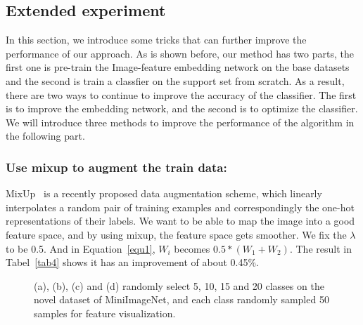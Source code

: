 \documentclass[runningheads]{llncs}
\begin{document}
\subsection{Extended experiment}
In this section, we introduce some tricks that can further improve the performance of our approach. As is shown before, our method has two parts, the first one is pre-train the Image-feature embedding network on the base datasets and the second is train a classfier on the support set from scratch. As a result, there are two ways to continue to improve the accuracy of the classifier. The first is to improve the embedding network, and the second is to optimize the classifier. We will introduce three methods to improve the performance of the algorithm in the following part.
\subsubsection{Use mixup to augment the train data:}
MixUp~\cite{zhang2017mixup} is a recently proposed data augmentation scheme, which linearly interpolates a random pair of training examples and correspondingly the one-hot representations of their labels. We want to be able to map the image into a good feature space, and by using mixup, the feature space gets smoother. We fix the $\lambda$to be 0.5. And in Equation~\ref{equ1}, $W_{i}$ becomes $0.5*(W_{1}+W_{2})$. The result in Tabel~\ref{tab4} shows it has an improvement of about 0.45\%.

\begin{figure}[htbp]
 \centering
\caption{(a), (b), (c) and (d) randomly select 5, 10, 15 and 20 classes on the novel dataset of MiniImageNet, and each class randomly sampled 50 samples for feature visualization.}
\label{fig2}
\end{figure}
\end{document}
